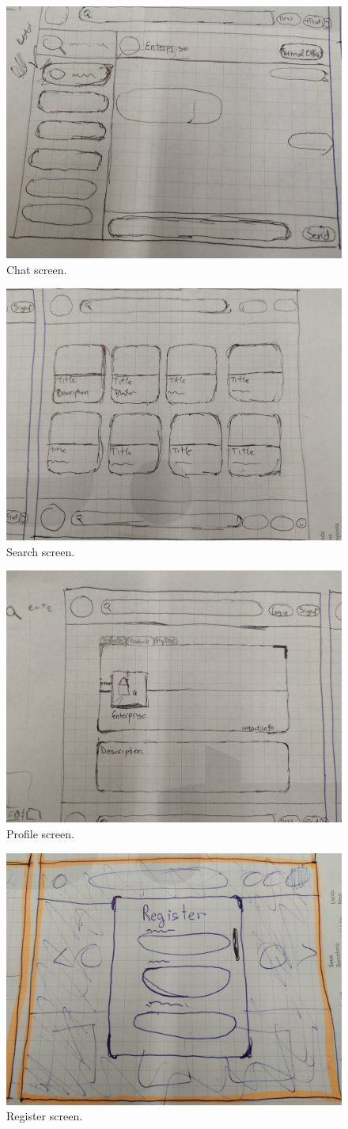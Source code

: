 \documentclass[./main.tex]{subfiles}
\begin{document}
\begin{figure}[H]
  \centering
  \includegraphics[width=0.5\linewidth]{img/webwire_4.jpeg}
  \caption{Chat screen.}
  \label{fig:webwire-screen-1}
\end{figure}
\begin{figure}[H]
  \centering
  \includegraphics[width=0.5\linewidth]{img/webwire_5.jpeg}
  \caption{Search screen.}
  \label{fig:webwire-screen-1}
\end{figure}
\begin{figure}[H]
  \centering
  \includegraphics[width=0.5\linewidth]{img/webwire_6.jpeg}
  \caption{Profile screen.}
  \label{fig:webwire-screen-1}
\end{figure}
\begin{figure}[H]
  \centering
  \includegraphics[width=0.5\linewidth]{img/webwire_7.jpeg}
  \caption{Register screen.}
  \label{fig:webwire-screen-1}
\end{figure}
\end{document}
